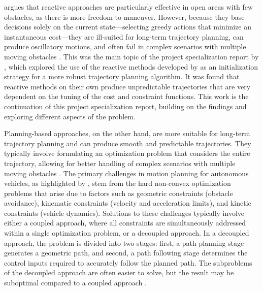 \citet{Wang2019} argues that reactive approaches are particularly effective in open areas with few obstacles, as there is more freedom to maneuver.
However, because they base decisions solely on the current state---selecting greedy actions that minimize an instantaneous cost---they are ill-suited for long-term trajectory planning, can produce oscillatory motions, and often fail in complex scenarios with multiple moving obstacles \citep{Liu2024-VO-Traj}. This was the main topic of the project specialization report by \cite{prosjektoppgave}, which explored the use of the reactive methods developed by \citet{Thyri2022-VO} as an initialization strategy for a more robust trajectory planning algorithm. It was found that reactive methods on their own produce unpredictable trajectories that are very dependent on the tuning of the cost and constraint functions. This work is the continuation of this project specialization report, building on the findings and exploring different aspects of the problem.

Planning-based approaches, on the other hand, are more suitable for long-term trajectory planning and can produce smooth and predictable trajectories. They typically involve formulating an optimization problem that considers the entire trajectory, allowing for better handling of complex scenarios with multiple moving obstacles \citep{Liu2024-VO-Traj}.
The primary challenges in motion planning for autonomous vehicles, as highlighted by \citet{mercy2016spline}, stem from the hard non-convex optimization problems that arise due to factors such as geometric constraints (obstacle avoidance), kinematic constraints (velocity and acceleration limits), and kinetic constraints (vehicle dynamics). Solutions to these challenges typically involve either a coupled approach, where all constraints are simultaneously addressed within a single optimization problem, or a decoupled approach. In a decoupled approach, the problem is divided into two stages: first, a path planning stage generates a geometric path, and second, a path following stage determines the control inputs required to accurately follow the planned path. The subproblems of the decoupled approach are often easier to solve, but the result may be suboptimal compared to a coupled approach \citep{mercy2016spline}.

